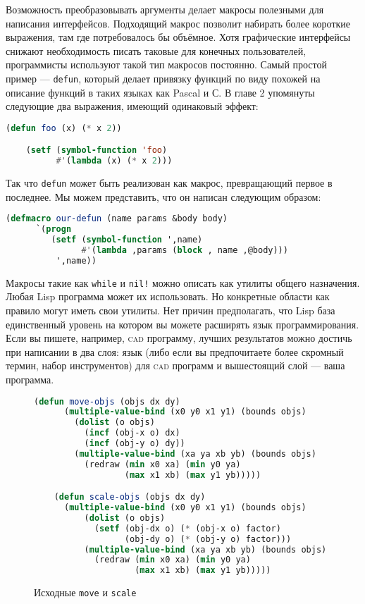 \documentclass[12pt, a4paper]{article} %
\begin{document}
Возможность преобразовывать аргументы делает макросы полезными для написания интерфейсов. Подходящий макрос позволит набирать более короткие выражения, там где потребовалось бы объёмное. Хотя графические интерфейсы снижают необходимость писать таковые для конечных пользователей, программисты используют такой тип макросов постоянно. Самый простой пример --- \texttt{defun}, который делает привязку функций по виду похожей на описание функций в таких языках как Pascal и С. В главе 2 упомянуты следующие два выражения, имеющий одинаковый эффект:
\begin{lstlisting}[language=Lisp]
    (defun foo (x) (* x 2))

    (setf (symbol-function 'foo)
          #'(lambda (x) (* x 2)))
\end{lstlisting}
Так что \texttt{defun} может быть реализован как макрос, превращающий первое в последнее. Мы можем представить, что он написан следующим образом:
\begin{lstlisting}[language=Lisp]
    (defmacro our-defun (name params &body body)
      `(progn 
         (setf (symbol-function ',name)
               #'(lambda ,params (block , name ,@body)))
          ',name))
\end{lstlisting}
Макросы такие как \texttt{while} и \texttt{nil!} можно описать как утилиты общего назначения. Любая Lisp программа может их использовать. Но конкретные области как правило могут иметь свои утилиты. Нет причин предполагать, что Lisp база единственный уровень на котором вы можете расширять язык программирования. Если вы пишете, например, \textsc{cad} программу, лучших результатов можно достичь при написании в два слоя: язык (либо если вы предпочитаете более скромный термин, набор инструментов) для \textsc{cad} программ и вышестоящий слой --- ваша программа. 
\begin{figure}[h]
\begin{lstlisting}[language=Lisp]
    (defun move-objs (objs dx dy)
      (multiple-value-bind (x0 y0 x1 y1) (bounds objs)
        (dolist (o objs)
          (incf (obj-x o) dx)
          (incf (obj-y o) dy))
        (multiple-value-bind (xa ya xb yb) (bounds objs)
          (redraw (min x0 xa) (min y0 ya)
                  (max x1 xb) (max y1 yb)))))

    (defun scale-objs (objs dx dy)
      (multiple-value-bind (x0 y0 x1 y1) (bounds objs)
          (dolist (o objs)
            (setf (obj-dx o) (* (obj-x o) factor)
                  (obj-dy o) (* (obj-y o) factor)))
          (multiple-value-bind (xa ya xb yb) (bounds objs)
            (redraw (min x0 xa) (min y0 ya)
                    (max x1 xb) (max y1 yb)))))
\end{lstlisting}
\caption{Исходные \texttt{move} и \texttt{scale}}
\label{fig:8-orig-move-scale}
\end{figure}
\end{document}
